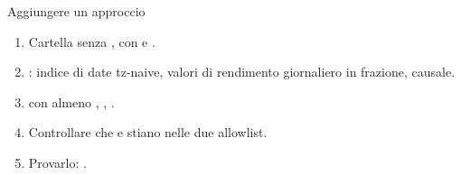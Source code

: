 \begin{pratica}{Aggiungere un approccio}
\begin{enumerate}
  \item Cartella senza \cod{\_}, con  e
        .
  \item {}: indice di date tz-naive,
        valori di rendimento giornaliero in frazione, causale.
  \item {} con almeno , ,
        .
  \item Controllare che  e  stiano
        nelle due allowlist.
  \item Provarlo: .
\end{enumerate}
\end{pratica}
